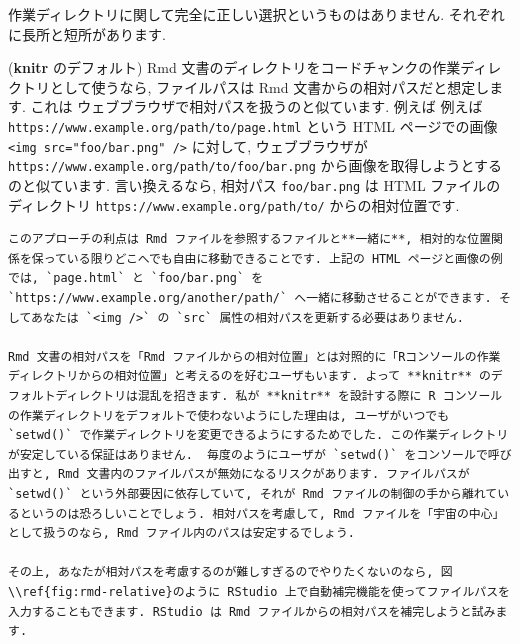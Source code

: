 \documentclass[
  11pt,
]{bxjsreport}
\begin{document}
作業ディレクトリに関して完全に正しい選択というものはありません. それぞれに長所と短所があります.

(\textbf{knitr} のデフォルト) Rmd 文書のディレクトリをコードチャンクの作業ディレクトリとして使うなら, ファイルパスは Rmd 文書からの相対パスだと想定します. これは ウェブブラウザで相対パスを扱うのと似ています. 例えば 例えば \texttt{https://www.example.org/path/to/page.html} という HTML ページでの画像 \texttt{\textless{}img\ src="foo/bar.png"\ /\textgreater{}} に対して, ウェブブラウザが \texttt{https://www.example.org/path/to/foo/bar.png} から画像を取得しようとするのと似ています. 言い換えるなら, 相対パス \texttt{foo/bar.png} は HTML ファイルのディレクトリ \texttt{https://www.example.org/path/to/} からの相対位置です.

\begin{verbatim}
このアプローチの利点は Rmd ファイルを参照するファイルと**一緒に**, 相対的な位置関係を保っている限りどこへでも自由に移動できることです. 上記の HTML ページと画像の例では, `page.html` と `foo/bar.png` を `https://www.example.org/another/path/` へ一緒に移動させることができます. そしてあなたは `<img />` の `src` 属性の相対パスを更新する必要はありません.

Rmd 文書の相対パスを「Rmd ファイルからの相対位置」とは対照的に「Rコンソールの作業ディレクトリからの相対位置」と考えるのを好むユーザもいます. よって **knitr** のデフォルトディレクトリは混乱を招きます. 私が **knitr** を設計する際に R コンソールの作業ディレクトリをデフォルトで使わないようにした理由は, ユーザがいつでも `setwd()` で作業ディレクトリを変更できるようにするためでした. この作業ディレクトリが安定している保証はありません.  毎度のようにユーザが `setwd()` をコンソールで呼び出すと, Rmd 文書内のファイルパスが無効になるリスクがあります. ファイルパスが `setwd()` という外部要因に依存していて, それが Rmd ファイルの制御の手から離れているというのは恐ろしいことでしょう. 相対パスを考慮して, Rmd ファイルを「宇宙の中心」として扱うのなら, Rmd ファイル内のパスは安定するでしょう.

その上, あなたが相対パスを考慮するのが難しすぎるのでやりたくないのなら, 図\\ref{fig:rmd-relative}のように RStudio 上で自動補完機能を使ってファイルパスを入力することもできます. RStudio は Rmd ファイルからの相対パスを補完しようと試みます.
\end{verbatim}
\end{document}
